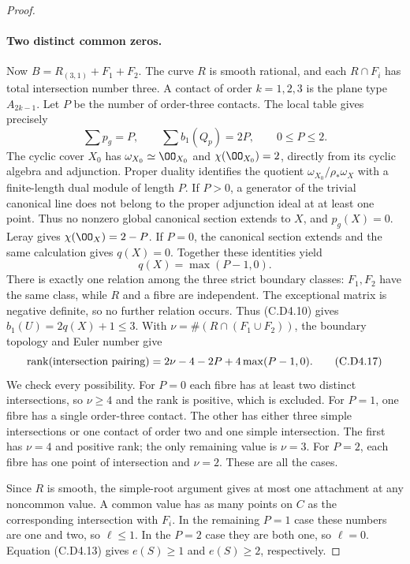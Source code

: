 \begin{proof}
\paragraph{Two distinct common zeros.}
Now $B=R_{(3,1)}+F_1+F_2$. The curve $R$ is smooth rational,
and each $R\cap F_i$ has total intersection number three.
A contact of order $k=1,2,3$ is the plane type $A_{2k-1}$.
Let $P$ be the number of order-three contacts. The local
table gives precisely
\[
              \sum p_g=P,\qquad \sum b_1(Q_p)=2P,
                         \qquad 0\le P\le2.
\tag{C.D4.15}
\]
The cyclic cover $X_0$ has $\omega_{X_0}\simeq\OO_{X_0}$
and $\chi(\OO_{X_0})=2$, directly from its cyclic algebra
and adjunction. Proper duality identifies the quotient
$\omega_{X_0}/\rho_*\omega_X$ with a finite-length dual
module of length $P$. If $P>0$, a generator of the trivial
canonical line does not belong to the proper adjunction
ideal at at least one point. Thus no nonzero global
canonical section extends to $X$, and $p_g(X)=0$.
Leray gives $\chi(\OO_X)=2-P$. If $P=0$, the canonical
section extends and the same calculation gives $q(X)=0$.
Together these identities yield
\[
                         q(X)=\max(P-1,0).
\tag{C.D4.16}
\]
There is exactly one relation among the three strict
boundary classes: $F_1,F_2$ have the same class, while
$R$ and a fibre are independent. The exceptional matrix
is negative definite, so no further relation occurs.
Thus (C.D4.10) gives $b_1(U)=2q(X)+1\le3$. With
$\nu=\#(R\cap(F_1\cup F_2))$, the boundary topology
and Euler number give
\[
 \operatorname{rank}(\hbox{intersection pairing})
          =2\nu-4-2P+4\max(P-1,0).
\tag{C.D4.17}
\]
We check every possibility. For $P=0$ each fibre has at
least two distinct intersections, so $\nu\ge4$ and the
rank is positive, which is excluded. For $P=1$, one fibre
has a single order-three contact. The other has either
three simple intersections or one contact of order two
and one simple intersection. The first has $\nu=4$ and
positive rank; the only remaining value is $\nu=3$.
For $P=2$, each fibre has one point of intersection and
$\nu=2$. These are all the cases.

Since $R$ is smooth, the simple-root argument gives at
most one attachment at any noncommon value. A common
value has as many points on $C$ as the corresponding
intersection with $F_i$. In the remaining $P=1$ case
these numbers are one and two, so $\ell\le1$. In the
$P=2$ case they are both one, so $\ell=0$.
Equation (C.D4.13) gives $e(S)\ge1$ and $e(S)\ge2$,
respectively.


\end{proof}
